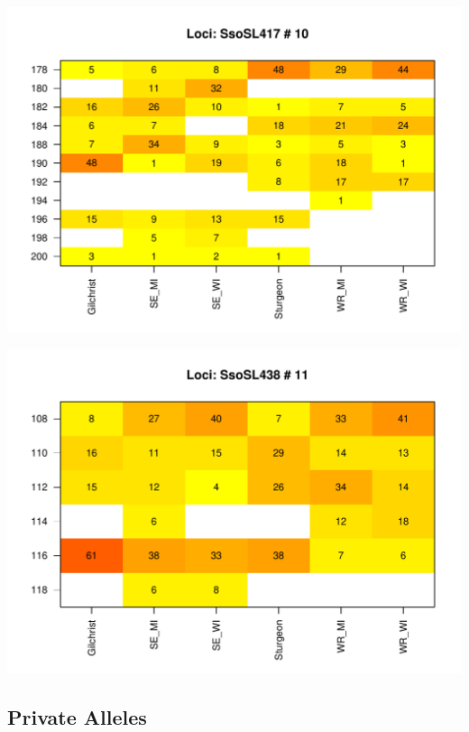 \documentclass[a4paper]{scrartcl}\usepackage[]{graphicx}\usepackage[]{color}
\makeatletter
\def\maxwidth{ %
  \ifdim\Gin@nat@width>\linewidth
    \linewidth
  \else
    \Gin@nat@width
  \fi
}
\newenvironment{knitrout}{}{} %
\makeatother
\begin{document}
\begin{knitrout}
\includegraphics[width=\maxwidth]{PopGenReport_Hatchery-heatmap-10} 

\includegraphics[width=\maxwidth]{PopGenReport_Hatchery-heatmap-11} 

\end{knitrout}
\FloatBarrier

\subsection{Private Alleles}

\FloatBarrier
\end{document}
